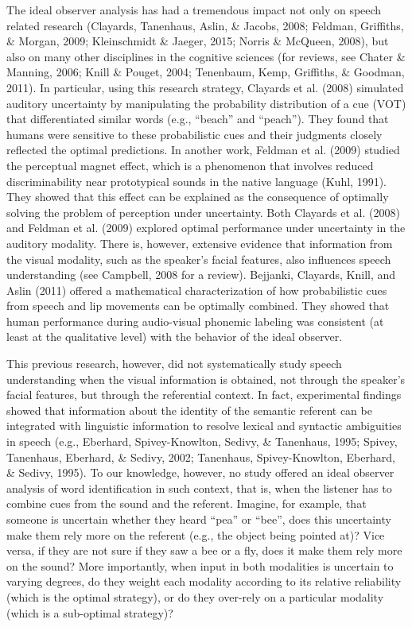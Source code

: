 \documentclass[english,floatsintext,man]{apa6}
\theoremstyle{definition}
\theoremstyle{definition}
\theoremstyle{definition}
\theoremstyle{remark}
\begin{document}
The ideal observer analysis has had a tremendous impact not only on
speech related research (Clayards, Tanenhaus, Aslin, \& Jacobs, 2008;
Feldman, Griffiths, \& Morgan, 2009; Kleinschmidt \& Jaeger, 2015;
Norris \& McQueen, 2008), but also on many other disciplines in the
cognitive sciences (for reviews, see Chater \& Manning, 2006; Knill \&
Pouget, 2004; Tenenbaum, Kemp, Griffiths, \& Goodman, 2011). In
particular, using this research strategy, Clayards et al. (2008)
simulated auditory uncertainty by manipulating the probability
distribution of a cue (VOT) that differentiated similar words (e.g.,
\enquote{beach} and \enquote{peach}). They found that humans were
sensitive to these probabilistic cues and their judgments closely
reflected the optimal predictions. In another work, Feldman et al.
(2009) studied the perceptual magnet effect, which is a phenomenon that
involves reduced discriminability near prototypical sounds in the native
language (Kuhl, 1991). They showed that this effect can be explained as
the consequence of optimally solving the problem of perception under
uncertainty. Both Clayards et al. (2008) and Feldman et al. (2009)
explored optimal performance under uncertainty in the auditory modality.
There is, however, extensive evidence that information from the visual
modality, such as the speaker's facial features, also influences speech
understanding (see Campbell, 2008 for a review). Bejjanki, Clayards,
Knill, and Aslin (2011) offered a mathematical characterization of how
probabilistic cues from speech and lip movements can be optimally
combined. They showed that human performance during audio-visual
phonemic labeling was consistent (at least at the qualitative level)
with the behavior of the ideal observer.

This previous research, however, did not systematically study speech
understanding when the visual information is obtained, not through the
speaker's facial features, but through the referential context. In fact,
experimental findings showed that information about the identity of the
semantic referent can be integrated with linguistic information to
resolve lexical and syntactic ambiguities in speech (e.g., Eberhard,
Spivey-Knowlton, Sedivy, \& Tanenhaus, 1995; Spivey, Tanenhaus,
Eberhard, \& Sedivy, 2002; Tanenhaus, Spivey-Knowlton, Eberhard, \&
Sedivy, 1995). To our knowledge, however, no study offered an ideal
observer analysis of word identification in such context, that is, when
the listener has to combine cues from the sound and the referent.
Imagine, for example, that someone is uncertain whether they heard
\enquote{pea} or \enquote{bee}, does this uncertainty make them rely
more on the referent (e.g., the object being pointed at)? Vice versa, if
they are not sure if they saw a bee or a fly, does it make them rely
more on the sound? More importantly, when input in both modalities is
uncertain to varying degrees, do they weight each modality according to
its relative reliability (which is the optimal strategy), or do they
over-rely on a particular modality (which is a sub-optimal strategy)?
\end{document}
